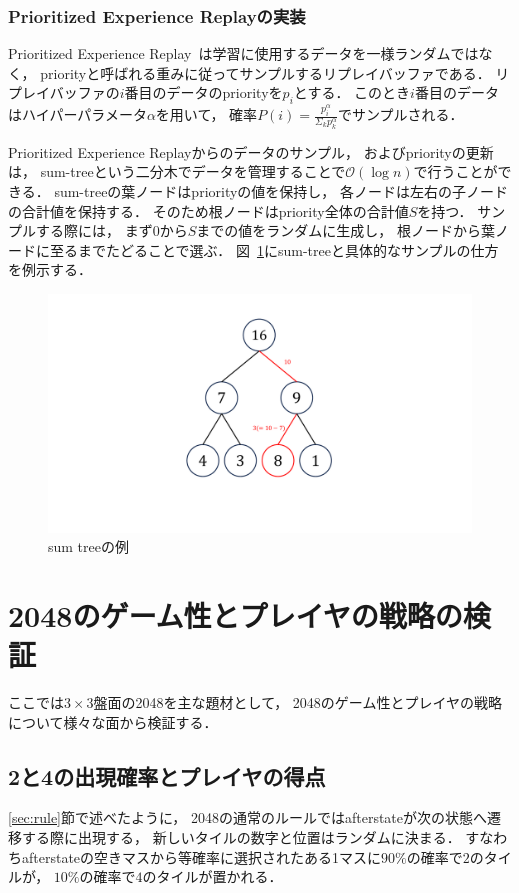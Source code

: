\subsection{Prioritized Experience Replayの実装}
Prioritized Experience Replay~\cite{prioritized}は学習に使用するデータを一様ランダムではなく， priorityと呼ばれる重みに従ってサンプルするリプレイバッファである．
リプレイバッファの$i$番目のデータのpriorityを$p_i$とする．
このとき$i$番目のデータはハイパーパラメータ$\alpha$を用いて， 確率$P(i) = \frac{p_{i}^{\alpha}}{\Sigma_k p_{k}^{\alpha}}$でサンプルされる．

Prioritized Experience Replayからのデータのサンプル， およびpriorityの更新は， sum-treeという二分木でデータを管理することで$\mathcal{O}(\log n)$で行うことができる．
sum-treeの葉ノードはpriorityの値を保持し， 各ノードは左右の子ノードの合計値を保持する．
そのため根ノードはpriority全体の合計値$S$を持つ．
サンプルする際には， まず$0$から$S$までの値をランダムに生成し， 根ノードから葉ノードに至るまでたどることで選ぶ．
図~\ref{fig:sumtree}にsum-treeと具体的なサンプルの仕方を例示する．
\begin{figure}[t]
    \centering
    \includegraphics[width=0.4\linewidth{}]{figures/sumtree_.pdf}
    \caption{sum treeの例}
    \label{fig:sumtree}
\end{figure}

\chapter{2048のゲーム性とプレイヤの戦略の検証}
ここでは$3\times3$盤面の2048を主な題材として， 2048のゲーム性とプレイヤの戦略について様々な面から検証する．

\section{2と4の出現確率とプレイヤの得点}
\ref{sec:rule}節で述べたように， 2048の通常のルールではafterstateが次の状態へ遷移する際に出現する， 新しいタイルの数字と位置はランダムに決まる．
すなわちafterstateの空きマスから等確率に選択されたある1マスに$90\%$の確率で$2$のタイルが， $10\%$の確率で$4$のタイルが置かれる．

